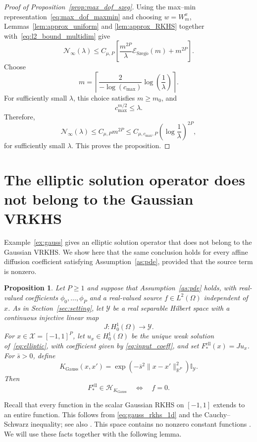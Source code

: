 \documentclass[11pt]{article}
\numberwithin{equation}{section}
\theoremstyle{plain}
\newtheorem{proposition}[theorem]{Proposition}
\theoremstyle{definition}
\theoremstyle{remark}
\newcommand{\X}{\mathcal{X}}
\newcommand{\Hs}{\mathcal{H}}
\newcommand{\Y}{\mathcal{Y}}
\newcommand{\I}{\mathbb{I}}
\begin{document}
\begin{proof}[Proof of Proposition~\ref{prop:max_dof_szeg}]
Using the max--min representation~\eqref{eq:max_dof_maxmin} and choosing
$w=W_m^x$, Lemmas~\ref{lem:approx_uniform} and
\ref{lem:approx_RKHS} together with~\eqref{eq:l2_bound_multidim} give
\[
\mathcal{N}_{\infty}(\lambda)
\leq
C_{\mu,P}
\left[
\frac{m^{2P}}{\lambda}
\mathcal{E}_{\mathrm{Szeg\ddot{o}}}(m)
+
m^{2P}
\right].
\]
Choose
\[
m=
\left\lceil
\frac{2}{-\log(c_{\max})}
\log\left(\frac{1}{\lambda}\right)
\right\rceil.
\]
For sufficiently small $\lambda$, this choice satisfies $m\geq m_0$, and
\[
c_{\max}^{m/2}\leq\lambda.
\]
Therefore,
\[
\mathcal{N}_{\infty}(\lambda)
\leq
C_{\mu,P}m^{2P}
\leq
C_{\mu,c_{\max},P}
\left(\log\frac{1}{\lambda}\right)^{2P},
\]
for sufficiently small $\lambda$. This proves the proposition.
\end{proof}

\section{The elliptic solution operator does not belong to the Gaussian VRKHS}
\label{app:gauss}

Example~\ref{ex:gauss} gives an elliptic solution operator that does not
belong to the Gaussian VRKHS. We show here that the same conclusion
holds for every affine diffusion coefficient satisfying
Assumption~\ref{as:pde}, provided that the source term is nonzero.

\begin{proposition}
\label{prop:ell_gaussian_nonmembership}
Let $P\geq1$ and suppose that Assumption~\ref{as:pde} holds, with
real-valued coefficients $\phi_0,\ldots,\phi_P$ and a real-valued source
$f\in L^2(\Omega)$ independent of $x$. As in
Section~\ref{sec:setting}, let $\Y$ be a real separable Hilbert space
with a continuous injective linear map
\[
J:H_0^1(\Omega)\longrightarrow\Y.
\]
For $x\in\X=[-1,1]^P$, let $u_x\in H_0^1(\Omega)$ be the
unique weak solution of~\eqref{eq:elliptic}, with coefficient given by
\eqref{eq:input_coeff}, and set $F_*^{\mathrm{ell}}(x)=Ju_x$.
For  $\bar s>0$, define
\[
K_{\mathrm{Gauss}}(x,x')
=\exp\!\left(-\bar s^2\|x-x'\|_{\mathbb R^P}^2\right)\I_{\Y}.
\]
Then
\[
F_*^{\mathrm{ell}}\in\Hs_{K_{\mathrm{Gauss}}}
\quad\Longleftrightarrow\quad f=0.
\]
\end{proposition}

Recall that every function in the scalar Gaussian RKHS on $[-1,1]$
extends to an entire function. This follows from
\eqref{eq:gauss_rkhs_1d} and the Cauchy--Schwarz inequality; see also
\cite[Theorem~1]{minh2010some}. This space contains no nonzero
constant functions \cite[Theorem~2]{minh2010some}.
We will use these facts together with the following lemma.
\end{document}
